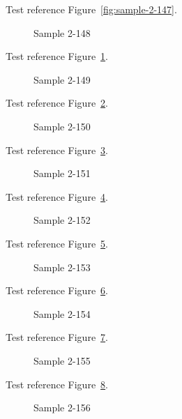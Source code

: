 Test reference Figure~\ref{fig:sample-2-147}.

\begin{figure}[tbhp]
\caption{Sample 2-148}
\label{fig:sample-2-148}
\end{figure}

Test reference Figure~\ref{fig:sample-2-148}.

\begin{figure}[tbhp]
\caption{Sample 2-149}
\label{fig:sample-2-149}
\end{figure}

Test reference Figure~\ref{fig:sample-2-149}.

\begin{figure}[tbhp]
\caption{Sample 2-150}
\label{fig:sample-2-150}
\end{figure}

Test reference Figure~\ref{fig:sample-2-150}.

\begin{figure}[tbhp]
\caption{Sample 2-151}
\label{fig:sample-2-151}
\end{figure}

Test reference Figure~\ref{fig:sample-2-151}.

\begin{figure}[tbhp]
\caption{Sample 2-152}
\label{fig:sample-2-152}
\end{figure}

Test reference Figure~\ref{fig:sample-2-152}.

\begin{figure}[tbhp]
\caption{Sample 2-153}
\label{fig:sample-2-153}
\end{figure}

Test reference Figure~\ref{fig:sample-2-153}.

\begin{figure}[tbhp]
\caption{Sample 2-154}
\label{fig:sample-2-154}
\end{figure}

Test reference Figure~\ref{fig:sample-2-154}.

\begin{figure}[tbhp]
\caption{Sample 2-155}
\label{fig:sample-2-155}
\end{figure}

Test reference Figure~\ref{fig:sample-2-155}.

\begin{figure}[tbhp]
\caption{Sample 2-156}
\label{fig:sample-2-156}
\end{figure}

